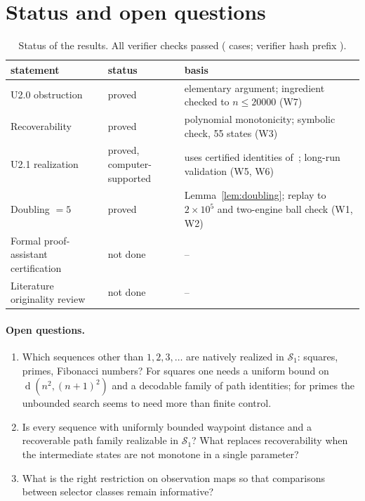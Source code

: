 \documentclass[11pt]{article}
\theoremstyle{definition}
\newcommand{\dist}{\operatorname{d}}
\begin{document}
\section{Status and open questions}\label{sec:status}
\begin{table}[ht]\centering\small
\begin{tabular}{@{}p{}p{}p{}@{}}\toprule
statement & status & basis\\\midrule
U2.0 obstruction & proved & elementary argument; ingredient checked to $n\le20000$ (W7)\\
Recoverability & proved & polynomial monotonicity; symbolic check, 55 states (W3)\\
U2.1 realization & proved, computer-supported & uses certified identities of~\cite{u1bnd}; long-run validation (W5, W6)\\
Doubling $=5$ & proved & Lemma~\ref{lem:doubling}; replay to $2\times10^5$ and two-engine ball check (W1, W2)\\
Formal proof-assistant certification & not done & --\\
Literature originality review & not done & --\\\bottomrule
\end{tabular}
\caption{Status of the results. All verifier checks passed (\TotalCases{} cases; verifier hash prefix \texttt{\VerSha}).}\label{tab:status}
\end{table}
\paragraph{Open questions.}
\begin{enumerate}[nosep]
\item Which sequences other than $1,2,3,\ldots$ are natively realized in $\mathcal S_1$: squares, primes, Fibonacci numbers? For squares one needs a uniform bound on $\dist(n^2,(n+1)^2)$ and a decodable family of path identities; for primes the unbounded search seems to need more than finite control.
\item Is every sequence with uniformly bounded waypoint distance and a recoverable path family realizable in $\mathcal S_1$? What replaces recoverability when the intermediate states are not monotone in a single parameter?
\item What is the right restriction on observation maps so that comparisons between selector classes remain informative?
\end{enumerate}
\end{document}
